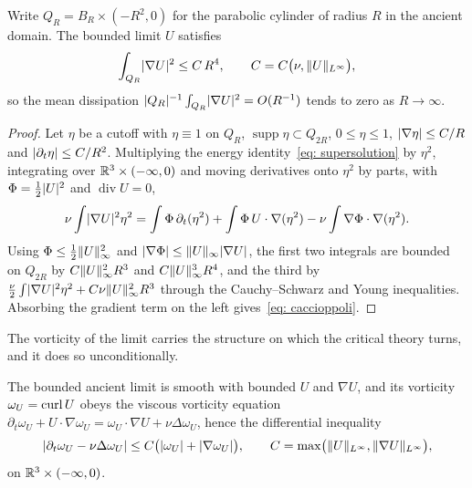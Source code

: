 \begin{lemma}\label{lem: caccioppoli}
Write $Q_R = B_R\times(-R^2,0)$ for the parabolic cylinder of radius $R$ in the
ancient domain. The bounded limit $U$ satisfies
\begin{equation}\label{eq: caccioppoli}
  \int_{Q_R}\lvert \nabla U \rvert^2 \le C\,R^{4},
  \qquad C = C\bigl(\nu, \lVert U \rVert_{L^\infty}\bigr),
\end{equation}
so the mean dissipation $\lvert Q_R \rvert^{-1}\int_{Q_R}\lvert \nabla U \rvert^2 = O(R^{-1})$ tends
to zero as $R\to\infty$.
\end{lemma}

\begin{proof}
Let $\eta$ be a cutoff with $\eta\equiv1$ on $Q_R$, $\operatorname{supp}\eta\subset
Q_{2R}$, $0\le\eta\le1$, $\lvert \nabla\eta \rvert\le C/R$ and $\lvert \partial_t\eta \rvert\le
C/R^2$. Multiplying the energy identity~\eqref{eq: supersolution} by $\eta^2$,
integrating over $\mathbb{R}^3\times(-\infty,0)$ and moving derivatives onto $\eta^2$ by
parts, with $\Phi = \tfrac12\lvert U \rvert^2$ and $\operatorname{div}U=0$,
\[
  \nu\int\lvert \nabla U \rvert^2\eta^2
  = \int\Phi\,\partial_t(\eta^2)
  + \int\Phi\,U\cdot\nabla(\eta^2)
  - \nu\int\nabla\Phi\cdot\nabla(\eta^2).
\]
Using $\Phi\le\tfrac12\lVert U \rVert_\infty^2$ and $\lvert \nabla\Phi \rvert\le
\lVert U \rVert_\infty\lvert \nabla U \rvert$, the first two integrals are bounded on $Q_{2R}$ by
$C\lVert U \rVert_\infty^2 R^{3}$ and $C\lVert U \rVert_\infty^3 R^{4}$, and the third by
$\tfrac{\nu}{2}\int\lvert \nabla U \rvert^2\eta^2 + C\nu\lVert U \rVert_\infty^2 R^{3}$ through the
Cauchy--Schwarz and Young inequalities. Absorbing the gradient term on the left
gives~\eqref{eq: caccioppoli}.
\end{proof}

The vorticity of the limit carries the structure on which the critical theory turns,
and it does so unconditionally.

\begin{lemma}\label{lem: vorticity-ineq}
The bounded ancient limit is smooth with bounded $U$ and $\nabla U$, and its
vorticity $\omega_U = \operatorname{curl} U$ obeys the viscous vorticity equation
$\partial_t\omega_U + U\cdot\nabla\omega_U
= \omega_U\cdot\nabla U + \nu\Delta\omega_U$, hence the differential inequality
\begin{equation}\label{eq: vorticity-ineq}
  \lvert \partial_t\omega_U - \nu\Delta\omega_U \rvert
  \le C\bigl(\lvert \omega_U \rvert + \lvert \nabla\omega_U \rvert\bigr),
  \qquad C = \max\bigl(\lVert U \rVert_{L^\infty}, \lVert \nabla U \rVert_{L^\infty}\bigr),
\end{equation}
on $\mathbb{R}^3\times(-\infty,0)$.
\end{lemma}

